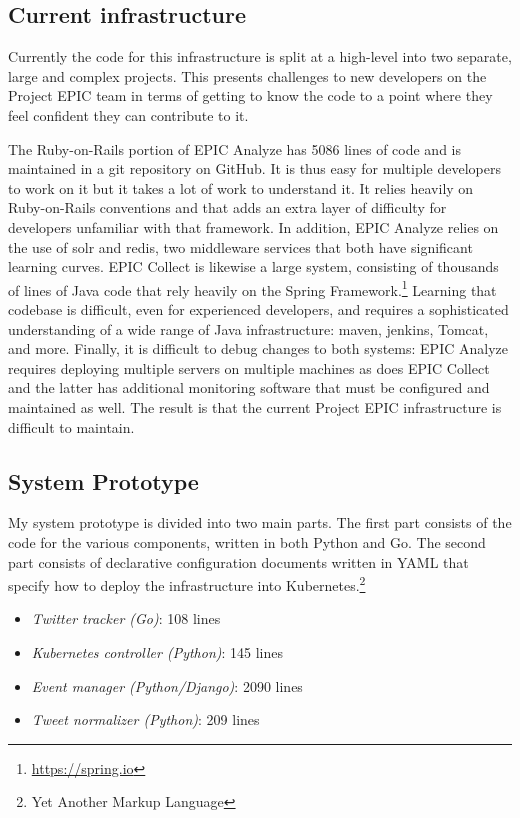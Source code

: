 \subsection{Current infrastructure}

Currently the code for this infrastructure is split at a high-level into two separate, large and complex projects. This presents challenges to new developers on the Project EPIC team in terms of getting to know the code to a point where they feel confident they can contribute to it.

The Ruby-on-Rails portion of EPIC Analyze has 5086 lines of code and is maintained in a git repository on GitHub. It is thus easy for multiple developers to work on it but it takes a lot of work to understand it. It relies heavily on Ruby-on-Rails conventions and that adds an extra layer of difficulty for developers unfamiliar with that framework. In addition, EPIC Analyze relies on the use of solr and redis, two middleware services that both have significant learning curves. EPIC Collect is likewise a large system, consisting of thousands of lines of Java code that rely heavily on the Spring Framework.\footnote{\href{https://spring.io}{https://spring.io}} Learning that codebase is difficult, even for experienced developers, and requires a sophisticated understanding of a wide range of Java infrastructure: maven, jenkins, Tomcat, and more. Finally, it is difficult to debug changes to both systems: EPIC Analyze requires deploying multiple servers on multiple machines as does EPIC Collect and the latter has additional monitoring software that must be configured and maintained as well. The result is that the current Project EPIC infrastructure is difficult to maintain.

\subsection{System Prototype}

My system prototype is divided into two main parts. The first part consists of the code for the various components, written in both Python and Go. The second part consists of declarative configuration documents written in YAML that specify how to deploy the infrastructure into Kubernetes.\footnote{Yet Another Markup Language}

\begin{itemize}
	\item \textit{Twitter tracker (Go)}: 108 lines
	\item \textit{Kubernetes controller (Python)}: 145 lines
	\item \textit{Event manager (Python/Django)}: 2090 lines
	\item \textit{Tweet normalizer (Python)}: 209 lines
\end{itemize}

